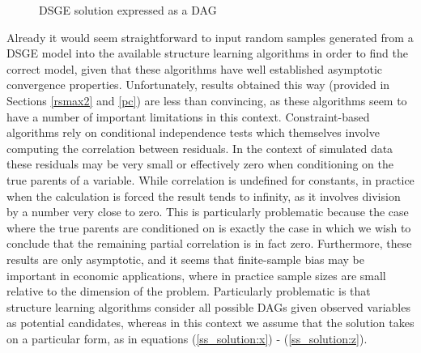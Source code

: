 \documentclass{article}
\begin{document}
\begin{figure}
  \centering
  \caption{DSGE solution expressed as a DAG}
  \label{dsge_dag}
\end{figure}

Already it would seem straightforward to input random samples generated from a DSGE model into the available structure learning algorithms in order to find the correct model, given that these algorithms have well established asymptotic convergence properties. Unfortunately, results obtained this way (provided in Sections \ref{rsmax2} and \ref{pc}) are less than convincing, as these algorithms seem to have a number of important limitations in this context. Constraint-based algorithms rely on conditional independence tests which themselves involve computing the correlation between residuals. In the context of simulated data these residuals may be very small or effectively zero when conditioning on the true parents of a variable. While correlation is undefined for constants, in practice when the calculation is forced the result tends to infinity, as it involves division by a number very close to zero. This is particularly problematic because the case where the true parents are conditioned on is exactly the case in which we wish to conclude that the remaining partial correlation is in fact zero. Furthermore, these results are only asymptotic, and it seems that finite-sample bias may be important in economic applications, where in practice sample sizes are small relative to the dimension of the problem. Particularly problematic is that structure learning algorithms consider all possible DAGs given observed variables as potential candidates, whereas in this context we assume that the solution takes on a particular form, as in equations (\ref{ss_solution:x}) - (\ref{ss_solution:z}).
\end{document}
